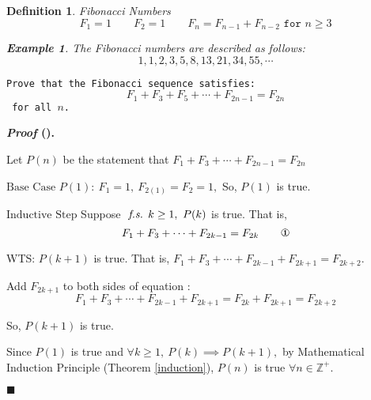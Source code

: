 \documentclass[12pt,a4paper]{article}
\newtheorem{df}{Definition}[subsection]
\newtheorem{eg}{Example}[subsection]
\newcounter{nprf}[subsection]
\newenvironment*{prf}{\par\indent\textbf{\textit{Proof} (\stepcounter{nprf}\thenprf). }\par}{\par\hfill $\blacksquare$\par}
\def\Z{{\mathbb{Z}}}
\def\Zp{{\Z^{+}}}
\def\fs{\emph{ f.s. }}
\begin{document}
\begin{df}{Fibonacci Numbers}\[F_1=1\qquad F_2=1\qquad F_n=F_{n-1}+F_{n-2}\texttt{ for }n\geq3\]
	\begin{eg}
		The \textit{Fibonacci numbers} are described as follows: \[1,1,2,3,5,8,13,21,34,55,\cdots\]	
	\end{eg}
\end{df}
\begin{framed}
\noindent\texttt{Prove that the Fibonacci sequence satisfies: \[F_1+F_3+F_5+\cdots+F_{2n-1}=F_{2n}\] for all $n$.}
\begin{prf}
	Let $P(n)$ be the statement that $F_1+F_3+\cdots+F_{2n-1}=F_{2n}$\par$\boxed{\text{Base Case}}$ $P(1):\ F_1=1,\ F_{2(1)}=F_2=1,$ So, $P(1)$ is true. \par$\boxed{\text{Inductive Step}}$ Suppose $\fs k\geq1,\ P(k)$ is true. That is, \[F_1+F_3+\cdots+F_{2k-1}=F_{2k}\qquad\text{\ding{172}}\]\par\hspace{5mm} WTS: $P(k+1)$ is true. That is, $F_1+F_3+\cdots+F_{2k-1}+F_{2k+1}=F_{2k+2}.$\par\hspace{5mm} Add $F_{2k+1}$ to both sides of equation : \[F_1+F_3+\cdots+F_{2k-1}+F_{2k+1}=F_{2k}+F_{2k+1}=F_{2k+2}\]\par\hspace{5mm} So, $P(k+1)$ is true.\par Since $P(1)$ is true and $\forall k\geq1,\ P(k)\implies P(k+1),$ by Mathematical Induction Principle (Theorem \ref{induction}), $P(n)$ is true $\forall n\in\Zp.$
\end{prf}
\end{framed}
\end{document}

